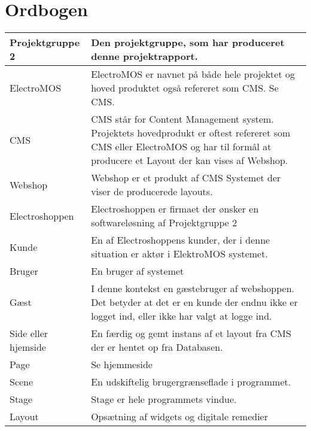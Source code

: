 \chapter{Ordbogen}
	\begin{tabular}{p{4cm}|p{12cm}}
        Projektgruppe 2 & Den projektgruppe, som har produceret denne projektrapport.\\ \hline
        
        ElectroMOS & ElectroMOS er navnet på både hele projektet og hoved produktet også refereret som CMS. Se CMS. \\ \hline
        
        CMS &  CMS står  for Content Management system. Projektets hovedprodukt er oftest refereret som CMS eller ElectroMOS og har til formål at producere et Layout der kan vises af Webshop.\\ \hline
        
        Webshop & Webshop er et produkt af CMS Systemet der viser de producerede layouts. \\ \hline
        
        Electroshoppen & Electroshoppen er firmaet der ønsker en softwareløsning af Projektgruppe 2  \\\hline
        
        Kunde & En af Electroshoppens kunder, der i denne situation er aktør i ElektroMOS systemet.\\\hline
        
        Bruger & En bruger af systemet\\\hline
        
        Gæst & I denne kontekst en gæstebruger af webshoppen. Det betyder at det er en kunde der endnu ikke er logget ind, eller ikke har valgt at logge ind.\\\hline
        
        Side eller hjemside & En færdig og gemt instans af et layout fra CMS der er hentet op fra Databasen. \\\hline
        
        Page & Se hjemmeside\\\hline
        
        Scene & En udskiftelig brugergrænseflade i programmet. \\\hline
        
        Stage & Stage er hele programmets vindue. \\\hline
        
        Layout & Opsætning af widgets og digitale remedier \\\hline
        

\end{tabular}
